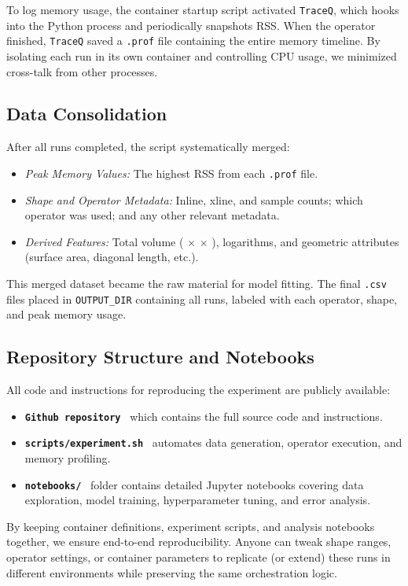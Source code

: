 To log memory usage, the container startup script activated \texttt{TraceQ}, which hooks into the Python process and periodically snapshots \ac{RSS}.
When the operator finished, \texttt{TraceQ} saved a \texttt{.prof} file containing the entire memory timeline.
By isolating each run in its own container and controlling \ac{CPU} usage, we minimized cross-talk from other processes.

\subsection{Data Consolidation}
\label{subsec:data-consolidation}

After all runs completed, the script systematically merged:
\begin{itemize}
    \item \emph{Peak Memory Values:} The highest \ac{RSS} from each \texttt{.prof} file.
    \item \emph{Shape and Operator Metadata:} Inline, xline, and sample counts; which operator was used; and any other relevant metadata.
    \item \emph{Derived Features:} Total volume ( $\times$  $\times$ ), logarithms, and geometric attributes (surface area, diagonal length, etc.).
\end{itemize}

This merged dataset became the raw material for model fitting.
The final \texttt{.csv} files placed in \texttt{OUTPUT\_DIR} containing all runs, labeled with each operator, shape, and peak memory usage.

\subsection{Repository Structure and Notebooks}
\label{subsec:repository-structure-and-notebooks}

All code and instructions for reproducing the experiment are publicly available:
\begin{itemize}
    \item \textbf{\texttt{Github repository}}~\cite{delucca2025experiment2} which contains the full source code and instructions.
    \item \textbf{\texttt{scripts/experiment.sh}}~\cite{delucca2025experiment2script} automates data generation, operator execution, and memory profiling.
    \item \textbf{\texttt{notebooks/}}~\cite{delucca2025experiment2notebooks} folder contains detailed Jupyter notebooks covering data exploration, model training, hyperparameter tuning, and error analysis.
\end{itemize}

By keeping container definitions, experiment scripts, and analysis notebooks together, we ensure end-to-end reproducibility.
Anyone can tweak shape ranges, operator settings, or container parameters to replicate (or extend) these runs in different environments while preserving the same orchestration logic.